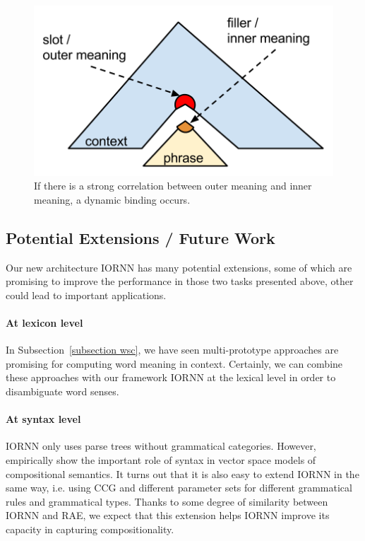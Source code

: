 \documentclass[11pt]{article}
\begin{document}
\begin{figure}[h!]
	\center
	\includegraphics[scale=0.5]{Inner_outer.png}
	\caption{If there is a strong correlation between outer meaning and inner meaning, a dynamic
	binding occurs.}
	\label{figure inner outer}
\end{figure}



\subsection{Potential Extensions / Future Work}
\label{subsection future work}

Our new architecture IORNN has many potential extensions, some of which are promising to improve 
the performance in those two tasks presented above, other could lead to important applications. 

\paragraph{At lexicon level} In Subsection~\ref{subsection wsc}, we 
have seen multi-prototype approaches are promising for computing word meaning in 
context. Certainly, we can combine these approaches with our framework IORNN at the 
lexical level in order to disambiguate word senses. 

\paragraph{At syntax level} IORNN only uses parse trees without grammatical categories. However, 
 empirically show the important role of syntax in vector space models of 
compositional semantics. It turns out that it is also easy to extend IORNN in the same way, 
i.e. using CCG and different parameter sets for different 
grammatical rules and grammatical types. Thanks to some degree of similarity between IORNN and 
RAE, we expect that this extension helps IORNN improve its capacity in capturing compositionality.
\end{document}
